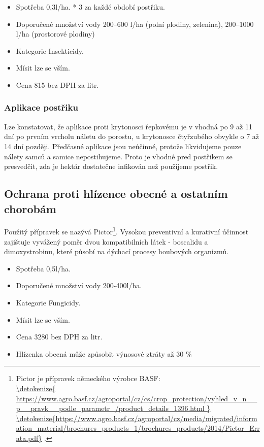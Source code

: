 \begin{itemize}
  \item Spotřeba 0,3l/ha. * 3 za každé období postřiku.
  \item Doporučené množství vody 200–600 l/ha (polní plodiny, zelenina), 200–1000 l/ha (prostorové plodiny) 
  \item Kategorie Insekticidy.
  \item Mísit lze se vším.
  \item Cena 815 bez DPH za litr.
\end{itemize}

\subsubsection{Aplikace postřiku}

Lze konstatovat, že aplikace proti krytonosci řepkovému je v vhodná po 9 až 11 dní po prvním vrcholu náletu do porostu, u krytonosce čtyřzubého obvykle o 7 až 14 dní později. Předčasné aplikace jsou neúčinné, protože likvidujeme pouze nálety samců a samice nepostihujeme. Proto je vhodné pred postřikem se presvedčit, zda je hektár dostatečne infikován než použijeme postřik.

\subsection{Ochrana proti hlízence obecné a ostatním chorobám}
Použitý přípravek se nazývá Pictor\footnote{Pictor je přípravek německého výrobce BASF: \\\url{\detokenize{
https://www.agro.basf.cz/agroportal/cz/cs/crop_protection/vyhled_v_n__p__pravk__podle_parametr_/product_details_1396.html
}}
\\\url{\detokenize{https://www.agro.basf.cz/agroportal/cz/media/migrated/information_material/brochures_products_1/brochures_products/2014/Pictor_Errata.pdf}}
.}.
Vysokou preventivní a kurativní účinnost zajištuje vyvážený poměr dvou kompatibilních látek - boscalidu a dimoxystrobinu, které působí na dýchací procesy houbových organizmů.
\begin{itemize}
  \item Spotřeba 0,5l/ha.
  \item Doporučené množství vody 200-400l/ha.
  \item Kategorie Fungicidy.
  \item Mísit lze se vším.
  \item Cena 3280 bez DPH za litr.
  \item Hlízenka obecná může způsobit výnosové 
ztráty až 30 \%
\end{itemize}

